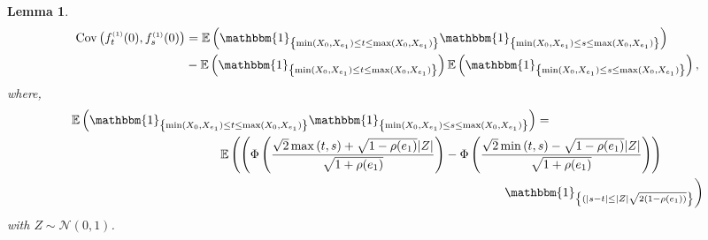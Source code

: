 \documentclass[12pt]{article}
\theoremstyle{Theorem}
\newtheorem{Lemma}[Theorem]{Lemma}
\begin{document}
\begin{Lemma}
\begin{align*}
\text{Cov}\left(f_{t}^{\scriptscriptstyle (1)}(0), f_{s}^{\scriptscriptstyle (1)}(0)\right) & = \mathbb{E}\left(\mathbbm{1}_{\left\{\min(X_{\scriptscriptstyle 0}, X_{\scriptscriptstyle  e_1}) \leq t \leq \max(X_{\scriptscriptstyle 0}, X_{e_1})\right\}}\mathbbm{1}_{\left\{\min(X_{\scriptscriptstyle 0}, X_{ \scriptscriptstyle  e_1}) \leq s \leq \max(X_{\scriptscriptstyle 0}, X_{\scriptscriptstyle e_1}) \right\}}\right) \\
& - \mathbb{E}\left(\mathbbm{1}_{\left\{\min(X_{\scriptscriptstyle 0}, X_{e_1}) \leq t \leq \max(X_{\scriptscriptstyle 0}, X_{e_1})\right\}}\right)\mathbb{E}\left(\mathbbm{1}_{\left\{\min(X_{\scriptscriptstyle 0}, X_{e_1}) \leq s \leq \max(X_{\scriptscriptstyle 0}, X_{e_1})\right\}}\right),
\end{align*}
where, 
{\small
\begin{align*}
\mathbb{E}\left(\mathbbm{1}_{\left\{\min(X_{\scriptscriptstyle 0}, X_{\scriptscriptstyle  e_1}) \leq t \leq \max(X_{\scriptscriptstyle 0}, X_{e_1})\right\}}\mathbbm{1}_{\left\{\min(X_{\scriptscriptstyle 0}, X_{ \scriptscriptstyle  e_1}) \leq s \leq \max(X_{\scriptscriptstyle 0}, X_{\scriptscriptstyle e_1}) \right\}}\right) & = \\
& \hspace{-9cm}\mathbb{E}\left(\left(\Phi\left(\dfrac{\sqrt{2}\max\left(t,s\right) + \sqrt{1-\rho(e_1)}|Z|}{\sqrt{1+\rho(e_1)}}\right)  - \Phi\left(\dfrac{\sqrt{2}\min\left(t,s\right) - \sqrt{1-\rho(e_1)}|Z|}{\sqrt{1+\rho(e_1)}}\right)\right)\right. \\
& \hspace{-1cm} \left.\mathbbm{1}_{\left\{(|s-t| \leq |Z|\sqrt{2(1-\rho(e_1))}\right\}}\right)
\end{align*}}
with $Z \sim \mathcal{N}(0,1)$. 
\end{Lemma}
\end{document}
